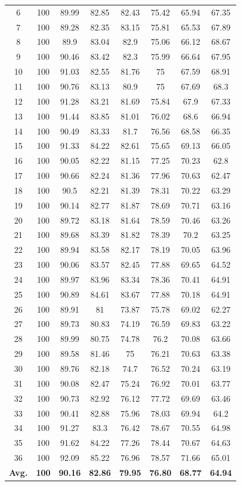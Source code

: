 \documentclass[review]{elsarticle}
\begin{document}
\begin{table}[ht!]
\begin{minipage}{0.48\linewidth}
{\begin{tabular}{c|ccccccc}
				6&100&89.99&82.85&82.43&75.42&65.94&67.35\\
				7&100&89.28&82.35&83.15&75.81&65.53&67.89\\
				8&100&89.9&83.04&82.9&75.06&66.12&68.67\\
				9&100&90.46&83.42&82.3&75.99&66.64&67.95\\
				10&100&91.03&82.55&81.76&75&67.59&68.91\\
				11&100&90.76&83.13&80.9&75&67.69&68.3\\
				12&100&91.28&83.21&81.69&75.84&67.9&67.33\\
				13&100&91.44&83.85&81.01&76.02&68.6&66.94\\
				14&100&90.49&83.33&81.7&76.56&68.58&66.35\\
				15&100&91.33&84.22&82.61&75.65&69.13&66.05\\
				16&100&90.05&82.22&81.15&77.25&70.23&62.8\\
				17&100&90.66&82.24&81.36&77.96&70.63&62.47\\
				18&100&90.5&82.21&81.39&78.31&70.22&63.29\\
				19&100&90.14&82.77&81.87&78.69&70.71&63.16\\
				20&100&89.72&83.18&81.64&78.59&70.46&63.26\\
				21&100&89.68&83.39&81.82&78.39&70.2&63.25\\
				22&100&89.94&83.58&82.17&78.19&70.05&63.96\\
				23&100&90.06&83.57&82.45&77.88&69.65&64.52\\
				24&100&89.97&83.96&83.34&78.36&70.41&64.91\\
				25&100&90.89&84.61&83.67&77.88&70.18&64.91\\
				26&100&89.91&81&73.87&75.78&69.02&62.27\\
				27&100&89.73&80.83&74.19&76.59&69.83&63.22\\
				28&100&89.99&80.75&74.78&76.2&70.08&63.66\\
				29&100&89.58&81.46&75&76.21&70.63&63.38\\
				30&100&89.76&82.18&74.7&76.52&70.24&63.19\\
				31&100&90.08&82.47&75.24&76.92&70.01&63.77\\
				32&100&90.73&82.92&76.12&77.72&69.69&63.46\\
				33&100&90.41&82.88&75.96&78.03&69.94&64.2\\
				34&100&91.27&83.3&76.42&78.67&70.55&64.98\\
				35&100&91.62&84.22&77.26&78.44&70.67&64.63\\
				36&100&92.09&85.22&76.96&78.57&71.66&65.01\\
				\hline
				\textbf{Avg.}&\textbf{100}&\textbf{90.16}&\textbf{82.86}&\textbf{79.95}&\textbf{76.80}&\textbf{68.77}&\textbf{64.94}\\
				\hline\hline	
		\end{tabular}}
	\end{minipage}
\end{table}
\end{document}
